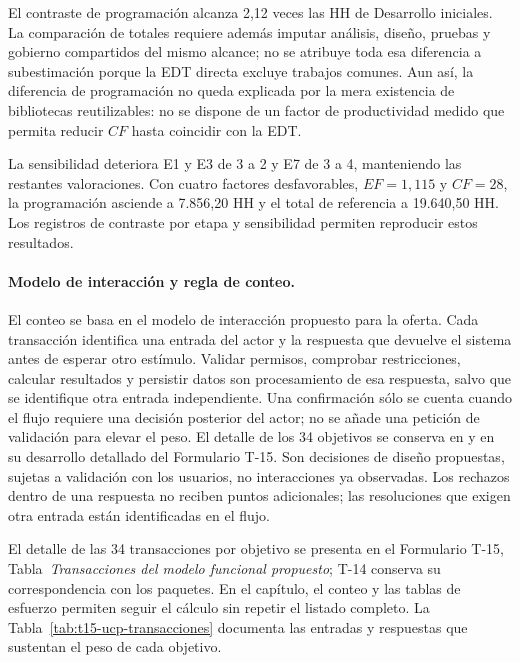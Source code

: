 El contraste de programación alcanza 2,12 veces las HH de Desarrollo iniciales. La comparación de totales requiere además imputar análisis, diseño, pruebas y gobierno compartidos del mismo alcance; no se atribuye toda esa diferencia a subestimación porque la EDT directa excluye trabajos comunes. Aun así, la diferencia de programación no queda explicada por la mera existencia de bibliotecas reutilizables: no se dispone de un factor de productividad medido que permita reducir $CF$ hasta coincidir con la EDT.

La sensibilidad deteriora E1 y E3 de 3 a 2 y E7 de 3 a 4, manteniendo las restantes valoraciones. Con cuatro factores desfavorables, $EF=1,115$ y $CF=28$, la programación asciende a 7.856,20 HH y el total de referencia a 19.640,50 HH. Los registros de contraste por etapa y sensibilidad permiten reproducir estos resultados.

\paragraph{Modelo de interacción y regla de conteo.} El conteo se basa en el modelo de interacción propuesto para la oferta. Cada transacción identifica una entrada del actor y la respuesta que devuelve el sistema antes de esperar otro estímulo. Validar permisos, comprobar restricciones, calcular resultados y persistir datos son procesamiento de esa respuesta, salvo que se identifique otra entrada independiente. Una confirmación sólo se cuenta cuando el flujo requiere una decisión posterior del actor; no se añade una petición de validación para elevar el peso. El detalle de los 34 objetivos se conserva en  y en su desarrollo detallado del Formulario T-15. Son decisiones de diseño propuestas, sujetas a validación con los usuarios, no interacciones ya observadas. Los rechazos dentro de una respuesta no reciben puntos adicionales; las resoluciones que exigen otra entrada están identificadas en el flujo.

\ifdefined\EnCuerpoSD
El detalle de las 34 transacciones por objetivo se presenta en el Formulario T-15, Tabla~\textit{Transacciones del modelo funcional propuesto}; T-14 conserva su correspondencia con los paquetes. En el capítulo, el conteo y las tablas de esfuerzo permiten seguir el cálculo sin repetir el listado completo.
\else
La Tabla~\ref{tab:t15-ucp-transacciones} documenta las entradas y respuestas que sustentan el peso de cada objetivo.



